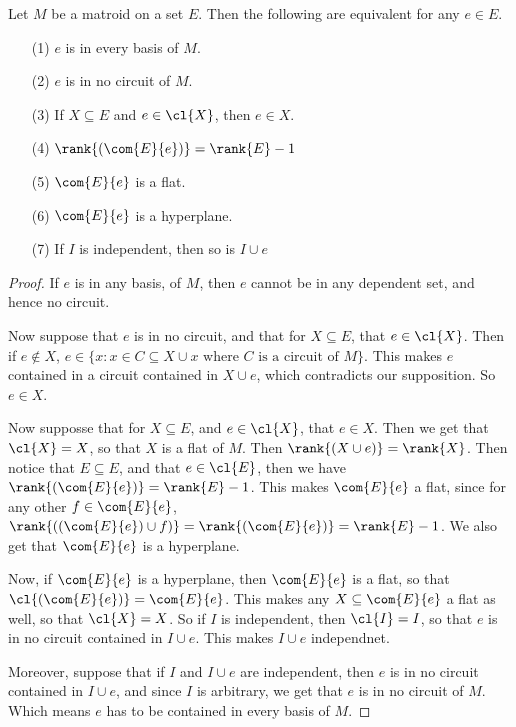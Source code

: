 \begin{lemma}\label{1.4.10}
    Let $M$ be a matroid on a set  $E$. Then the following are equivalent for
    any  $e \in E$.
    \begin{enumerate}
        \item[(1)] $e$ is in every basis of  $M$.

        \item[(2)] $e$ is in no circuit of  $M$.

        \item[(3)] If $X \subseteq E$ and  $e \in \cl{X}$, then $e \in X$.

        \item[(4)] $\rank{(\com{E}{e})}=\rank{E}-1$

        \item[(5)] $\com{E}{e}$ is a flat.

        \item[(6)] $\com{E}{e}$ is a hyperplane.

        \item[(7)] If $I$ is independent, then so is  $I \cup e$
    \end{enumerate}
\end{lemma}
\begin{proof}
    If $e$ is in any basis, of  $M$, then  $e$ cannot be in any dependent set,
    and hence no circuit.

    Now suppose that  $e$ is in no circuit, and that for  $X \subseteq E$, that
     $e \in \cl{X}$. Then if $e \notin X$,  $e \in \{x : x \in C \subseteq X
     \cup x \text{ where } C \text{ is a circuit of } M\}$. This makes $e$
     contained in a circuit contained in  $X \cup e$, which contradicts our
     supposition. So  $e \in X$.

     Now supposse that for  $X \subseteq E$, and  $e \in \cl{X}$, that $e \in
     X$. Then we get that  $\cl{X}=X$, so that $X$ is a flat of  $M$. Then
     $\rank{(X \cup e)}=\rank{X}$. Then notice that $E \subseteq E$, and that
     $e \in \cl{E}$, then we have $\rank{(\com{E}{e})}=\rank{E}-1$. This makes
     $\com{E}{e}$ a flat, since for any other $f \in \com{E}{e}$,
     $\rank{((\com{E}{e}) \cup f)}=\rank{(\com{E}{e})}=\rank{E}-1$. We also get
     that $\com{E}{e}$ is a hyperplane.

     Now, if $\com{E}{e}$ is a hyperplane, then $\com{E}{e}$ is a flat, so that
     $\cl{(\com{E}{e})}=\com{E}{e}$. This makes any $X \subseteq \com{E}{e}$ a
     flat as well, so that $\cl{X}=X$. So if $I$ is independent, then
     $\cl{I}=I$, so that $e$ is in no circuit contained in  $I \cup e$. This
     makes  $I \cup e$ independnet.

     Moreover, suppose that if $I$ and  $I \cup e$ are independent, then $e$ is
     in no circuit contained in $I \cup e$, and since  $I$ is arbitrary, we get
     that  $e$ is in no circuit of $M$. Which means $e$ has to be contained in
     every basis of $M$.
\end{proof}

